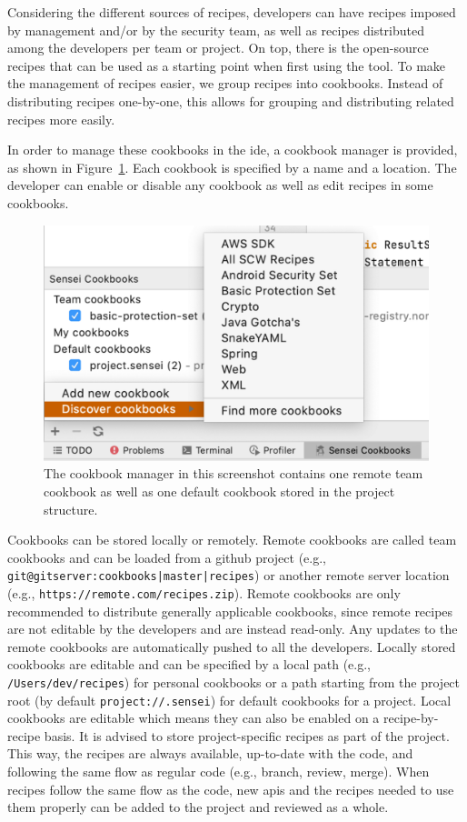 Considering the different sources of recipes, developers can have recipes imposed by management and/or by the security team, as well as recipes distributed among the developers per team or project.
On top, there is the open-source recipes that can be used as a starting point when first using the tool.
To make the management of recipes easier, we group recipes into cookbooks.
Instead of distributing recipes one-by-one, this allows for grouping and distributing related recipes more easily. 

In order to manage these cookbooks in the \gls{ide}, a cookbook manager is provided, as shown in Figure~\ref{fig:cookbookmanager}.
Each cookbook is specified by a name and a location.
The developer can enable or disable any cookbook as well as edit recipes in some cookbooks.

\begin{figure}
  \centering
  \includegraphics[width=\textwidth,page=3]{04-tools/figures/figures1.pdf}
  \caption[Cookbook manager]{The cookbook manager in this screenshot contains one remote team cookbook as well as one default cookbook stored in the project structure.}
  \label{fig:cookbookmanager} 
\end{figure}

Cookbooks can be stored locally or remotely.
Remote cookbooks are called team cookbooks and can be loaded from a github project (e.g., \texttt{git@gitserver:cookbooks|master|recipes}) or another remote server location (e.g., \texttt{https://remote.com/recipes.zip}).
Remote cookbooks are only recommended to distribute generally applicable cookbooks, since remote recipes are not editable by the developers and are instead read-only.
Any updates to the remote cookbooks are automatically pushed to all the developers.
Locally stored cookbooks are editable and can be specified by a local path (e.g., \texttt{/Users/dev/recipes}) for personal cookbooks or a path starting from the project root (by default \texttt{project://.sensei}) for default cookbooks for a project.
Local cookbooks are editable which means they can also be enabled on a recipe-by-recipe basis.
It is advised to store project-specific recipes as part of the project.
This way, the recipes are always available, up-to-date with the code, and following the same flow as regular code (e.g., branch, review, merge).
When recipes follow the same flow as the code, new \glspl{api} and the recipes needed to use them properly can be added to the project and reviewed as a whole. 

